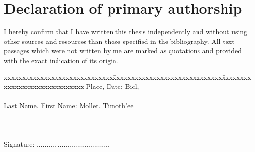 \chapter*{Declaration of primary authorship}
\label{chap:declaration_authorship}

\vspace*{10mm} 

I hereby confirm that I have written this thesis independently and without using other sources and resources than those specified in the bibliography. All text passages which were not written by me are marked as quotations and provided with the exact indication of its origin. 

\vspace{15mm}

\begin{tabbing}
xxxxxxxxxxxxxxxxxxxxxxxxxxxxxx\=xxxxxxxxxxxxxxxxxxxxxxxxxxxxxx\=xxxxxxxxxxxxxxxxxxxxxxxxxxxxxx\kill
Place, Date:		\>\> Biel, \versiondate \\ \\ 
Last Name, First Name:	\>\>Mollet, Timoth\a'{e}e 	 \\ \\ \\ \\ 
Signature:	\>\> ...................................... \\
\end{tabbing}
